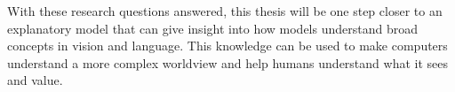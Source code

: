 \begin{comment}
For the visual domain, the FLEX-VQA method is proposed. This fusion of the \gls{flex} framework with the \gls{vqa} task archives the ability to both answer questions and describe images using locally accurate visual features. The features are extracted from the feature maps of the \gls{cnn}, labeled with a word with high co-occurrence. Finally, the words from the feature maps get formed into natural language descriptions by a language model.


\subsubsection{Linguistic Domain: Alpaca-VQA}
The explanatory models can only be applied to text input in the linguistic area. Since \glspl{llm} can be trained on large text corpora, they can learn connections and gain valuable insights into how language works. These insights can be used when creating explanatory models and using these linguistic insights to explain an answer to a user intuitively.\\
Specifically, the research questions in the linguistic field can be formulated as follows:

\begin{itemize}
    \item Can an \gls{llm} fine-tuned on a new modality brings new insights from its pertaining?

    \item Can additional methods explain an \gls{llm} after training is complete?
\end{itemize}

The model of choice used to answer the questions regarding the linguistic domain is the Alpaca model, adapted to the \gls{vqa} task. Because it is an \gls{llm} that has been pre-trained on a large corpus, it can use its extensive knowledge base to gain new insights and connections, thus expanding the available dataset for fine-tuning.

\end{comment}



With these research questions answered, this thesis will be one step closer to an explanatory model that can give insight into how models understand broad concepts in vision and language. This knowledge can be used to make computers understand a more complex worldview and help humans understand what it sees and value.




